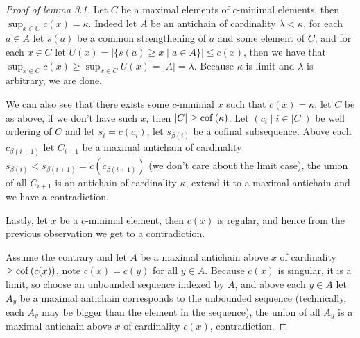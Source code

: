 \begin{cExercise}
\begin{proof}[Proof of lemma 3.1]
		Let $C$ be a maximal elements of $c$-minimal elements, then $\sup_{x\in C} c(x)=\kappa$. Indeed let $A$ be an antichain of cardinality $\lambda<\kappa$, for each $a\in A$ let $s(a)$ be a common strengthening of $a$ and some element of $C$, and for each $x\in C$ let $U(x)=|\{s(a)\ge x\mid a\in A\}|\le c(x)$, then we have that $\sup_{x\in C} c(x)\ge \sup_{x\in C} U(x)=|A|=\lambda$. Because $\kappa$ is limit and $\lambda$ is arbitrary, we are done.
		
		We can also see that there exists some $c$-minimal $x$ such that $c(x)=\kappa$, let $C$ be as above, if we don't have such $x$, then $|C|\ge\operatorname{cof}\left(\kappa\right)$. Let $(c_i\mid i\in |C|)$ be well ordering of $C$ and let $s_i=c(c_i)$, let $s_{\beta(i)}$ be a cofinal subsequence. Above each $c_{\beta(i+1)}$ let $C_{i+1}$ be a maximal antichain of cardinality $s_{\beta(i)}<s_{\beta(i+1)}=c(c_{\beta(i+1)})$ (we don't care about the limit case), the union of all $C_{i+1}$ is an antichain of cardinality $\kappa$, extend it to a maximal antichain and we have a contradiction.
		
		Lastly, let $x$ be a $c$-minimal element, then $c(x)$ is regular, and hence from the previous observation we get to a contradiction.
		
		Assume the contrary and let $A$ be a maximal antichain above $x$ of cardinality $\ge\operatorname{cof}\left(c(x)\right)$, note $c(x)=c(y)$ for all $y\in A$. Because $c(x)$ is singular, it is a limit, so choose an unbounded sequence indexed by $A$, and above each $y\in A$ let $A_y$ be a maximal antichain corresponds to the unbounded sequence (technically, each $A_y$ may be bigger than the element in the sequence), the union of all $A_y$ is a maximal antichain above $x$ of cardinality $c(x)$, contradiction.
	\end{proof}
\end{cExercise}
